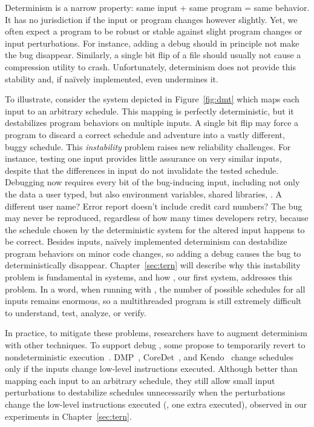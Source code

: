  Determinism is a
narrow property: same input + same program = same behavior. It has no
jurisdiction if the input or program changes however slightly.  Yet, we
often expect a program to be robust or stable against slight program
changes or input perturbations.  For instance, adding a debug 
should in principle not make the bug disappear.  Similarly, a single bit flip of
a file should usually not cause a compression utility to crash. Unfortunately,
determinism does not provide this stability and, if na\"{i}vely implemented,
even undermines it.

To illustrate, consider the system depicted in
Figure~\ref{fig:dmt} which maps each input to an arbitrary schedule. This
mapping is perfectly deterministic, but it destabilizes program
behaviors on multiple inputs.  A single bit flip may force a program to
discard a correct schedule and adventure into a vastly different, buggy
schedule. This \emph{instability} problem raises new reliability challenges. 
For instance, testing one input provides little assurance on very similar
inputs, despite that the differences in input do not invalidate the tested
schedule. Debugging now requires every bit of the bug-inducing input, including
not only the data a user typed, but also environment variables, shared
libraries, \etc. A different user name?  Error report doesn't include credit
card numbers?
The bug may never be reproduced, regardless of how many times developers
retry, because the schedule chosen by the deterministic system for the
altered input happens to be correct. Besides inputs, na\"{i}vely implemented
determinism can destabilize program behaviors on minor code changes, so adding a
debug  causes the bug to deterministically disappear.
Chapter~\ref{sec:tern} will describe why this instability problem is fundamental
in \dmt systems, and how \tern, our first \smt system, addresses this problem.
In a word, when running with \dmt, the number of possible schedules for all
inputs remains enormous, so a multithreaded program is still extremely difficult
to understand, test, analyze, or verify.

In practice, to mitigate these problems, researchers have to augment
determinism with other techniques.  To support debug , some
propose to temporarily revert to nondeterministic
execution~\cite{dmp:asplos09}.  DMP~\cite{dmp:asplos09},
CoreDet~\cite{coredet:asplos10}, and Kendo~\cite{kendo:asplos09} change
schedules only if the inputs change low-level instructions executed.
Although better than mapping each input to an arbitrary schedule, they
still allow small input perturbations to destabilize schedules
unnecessarily when the perturbations change the low-level instructions
executed (\eg, one extra  executed), observed in our
experiments in Chapter~\ref{sec:tern}.

